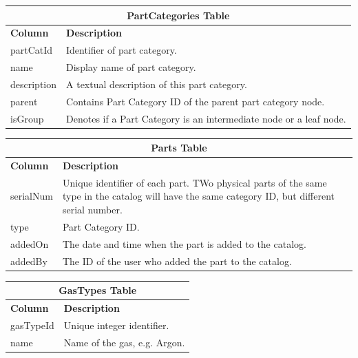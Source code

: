 \documentclass{sig-alternate}
\begin{document}
\begin{table}[h!]
\centering
\begin{tabular}{l p{6cm}}
\multicolumn{2}{c}{\bf PartCategories Table} \\ \hline
{\bf Column} & {\bf Description}\\ \hline
partCatId & Identifier of part category.\\ \hline
name & Display name of part category.\\ \hline
description & A textual description of this part category. \\ \hline
parent & Contains Part Category ID of the parent part category node.\\ \hline
isGroup & Denotes if a Part Category is an intermediate node or a leaf node. \\ \hline
\end{tabular}
\end{table}

\begin{table}[h!]
\centering
\begin{tabular}{l p{6cm}}
\multicolumn{2}{c}{\bf Parts Table} \\ \hline
{\bf Column} & {\bf Description}\\ \hline
serialNum & Unique identifier of each part. TWo physical parts of the same type in the catalog will have the same category ID, but different serial number.\\ \hline
type & Part Category ID.\\ \hline
addedOn & The date and time when the part is added to the catalog. \\ \hline
addedBy & The ID of the user who added the part to the catalog.\\ \hline
\end{tabular}
\end{table}

\begin{table}[h!]
\centering
\begin{tabular}{l p{6cm}}
\multicolumn{2}{c}{\bf GasTypes Table} \\ \hline
{\bf Column} & {\bf Description}\\ \hline
gasTypeId & Unique integer identifier.\\ \hline
name & Name of the gas, e.g. Argon.\\ \hline
\end{tabular}
\end{table}
\end{document}
